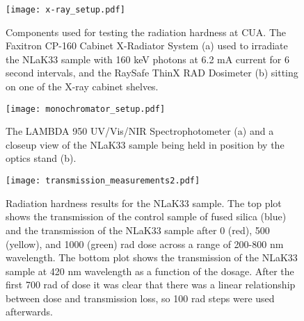\begin{figure}[!htb]
	\centering
	\texttt{[image: x-ray\_setup.pdf]}
	\caption[Components used for testing the radiation hardness at CUA. ]{Components used for testing the radiation hardness at CUA. The Faxitron CP-160 Cabinet X-Radiator System (a) used to irradiate the NLaK33 sample with 160 keV photons at 6.2 mA current for 6 second intervals, and the RaySafe ThinX RAD Dosimeter (b) sitting on one of the X-ray cabinet shelves.}
	\label{fig:x-ray_setup}
\end{figure}


\begin{figure}[!htb]
	\centering
	\texttt{[image: monochromator\_setup.pdf]}
	\caption{The LAMBDA 950 UV/Vis/NIR Spectrophotometer (a) and a closeup view of the NLaK33 sample being held in position by the optics stand (b).}
	\label{fig:monochromator_setup}
\end{figure}

\begin{figure}[!htb]
	\centering
	\texttt{[image: transmission\_measurements2.pdf]}
	\caption[Radiation hardness results for the NLaK33 sample.]{Radiation hardness results for the NLaK33 sample. The top plot shows the transmission of the control sample of fused silica (blue) and the transmission of the NLaK33 sample after 0 (red), 500 (yellow), and 1000 (green) rad dose across a range of 200-800 nm wavelength. The bottom plot shows the transmission of the NLaK33 sample at 420 nm wavelength as a function of the dosage. After the first 700 rad of dose it was clear that there was a linear relationship between dose and transmission loss, so 100 rad steps were used afterwards.}
	\label{fig:transmission_measurements}
\end{figure}


\clearpage
